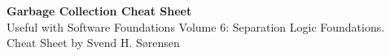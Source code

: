\documentclass[10pt,a4paper]{article}
\newcommand{\emp}{[\: ]} %
\newcommand{\hwand}{-\!\!\star}
\newcommand{\qstar}{\text{ \d{$\star$} }} %
\newcommand{\mapstoheap}{\mapsto}
\begin{document}
\pagestyle{empty}
\begin{center}
  {\LARGE \textbf{Garbage Collection Cheat Sheet}}\\[1ex]
  {\small Useful with Software Foundations Volume 6: Separation Logic Foundations. Cheat Sheet by Svend H. Sørensen}
\end{center}

\begin{multicols}{2}


\end{multicols}
\end{document}
